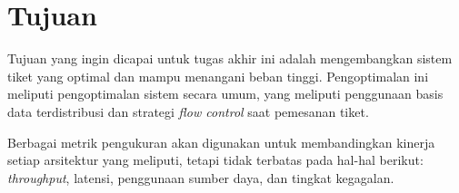 \section{Tujuan}

Tujuan yang ingin dicapai untuk tugas akhir ini adalah mengembangkan sistem tiket yang optimal dan mampu menangani beban tinggi. Pengoptimalan ini meliputi pengoptimalan sistem secara umum, yang meliputi penggunaan basis data terdistribusi dan strategi \textit{flow control} saat pemesanan tiket.

Berbagai metrik pengukuran akan digunakan untuk membandingkan kinerja setiap arsitektur yang meliputi, tetapi tidak terbatas pada hal-hal berikut: \textit{throughput}, latensi, penggunaan sumber daya, dan tingkat kegagalan.
